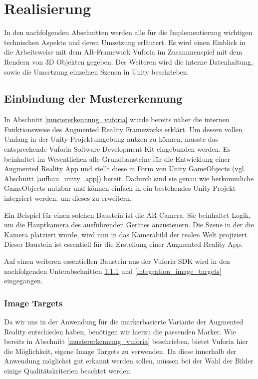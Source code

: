 \chapter{Realisierung}\label{ch:realisierung_der_anwendung}
In den nachfolgenden Abschnitten werden alle für die Implementierung wichtigen technischen Aspekte und deren Umsetzung erläutert. Es wird einen Einblick in die Arbeitsweise mit dem AR-Framework Vuforia im Zusammenspiel mit dem Rendern von 3D Objekten gegeben. Des Weiteren wird die interne Datenhaltung, sowie die Umsetzung einzelnen Szenen in Unity beschrieben.

\section{Einbindung der Mustererkennung}\label{einbindung_mustererkennung}
In Abschnitt \ref{mustererkennung_vuforia} wurde bereits näher die internen Funktionsweise des Augmented Reality Frameworks  erklärt. 
Um dessen vollen Umfang in der Unity-Projektumgebung nutzen zu können, musste das entsprechende Vuforia Software Development Kit eingebunden werden.
Es beinhaltet im Wesentlichen alle Grundbausteine für die Entwicklung einer Augmented Reality App und stellt diese in Form von Unity GameObjects (vgl. Abschnitt \ref{aufbau_unity_app}) bereit. 
Dadurch sind sie genau wie herkömmliche GameObjects nutzbar und können einfach in ein bestehendes Unity-Projekt integriert werden, um dieses zu erweitern.

Ein Beispiel für einen solchen Baustein ist die AR Camera. 
Sie beinhaltet Logik, um die Hauptkamera des ausführenden Gerätes anzusteuern. 
Die Szene in der die Kamera platziert wurde, wird nun in das Kamerabild der realen Welt projiziert.
Dieser Baustein ist essentiell für die Erstellung einer Augmented Reality App. 

Auf einen weiteren essentiellen Baustein aus der Vuforia SDK wird in den nachfolgenden Unterabschnitten \ref{image_targets} und \ref{integration_image_targets} eingegangen. 

\subsection{Image Targets}\label{image_targets}
Da wir uns in der Anwendung für die markerbasierte Variante der Augmented Reality entschieden haben, benötigen wir hierzu die passenden Marker. 
Wie bereits in Abschnitt \ref{mustererkennung_vuforia} beschrieben, bietet Vuforia hier die Möglichkeit, eigene Image Targets zu verwenden. 
Da diese innerhalb der Anwendung möglichst gut erkannt werden sollen, müssen bei der Wahl der Bilder einige Qualitätskriterien beachtet werden.

